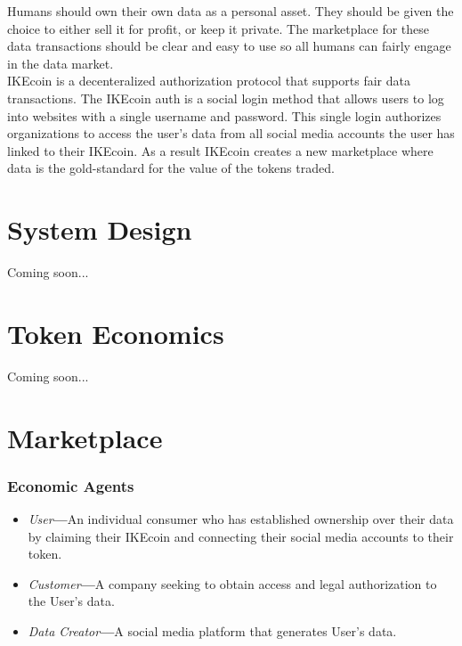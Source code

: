 \documentclass[12pt, letterpaper, twoside]{article}
\begin{document}
Humans should own their own data as a personal asset. They should be given the choice to either sell it for profit, or keep it private. The marketplace for these data transactions should be clear and easy to use so all humans can fairly engage in the data market. \\

IKEcoin is a decenteralized authorization protocol that supports fair data transactions. The IKEcoin auth is a social login method that allows users to log into websites with a single username and password. This single login authorizes organizations to access the user's data from all social media accounts the user has linked to their IKEcoin. As a result IKEcoin creates a new marketplace where data is the gold-standard for the value of the tokens traded. \\

\section{System Design}
Coming soon...


\section{Token Economics}
Coming soon...


\section{Marketplace}
\subsubsection*{Economic Agents}
\begin{itemize}
\item \textit{User}\textbf{---}An individual consumer who has established ownership over their data by claiming their IKEcoin and connecting their social media accounts to their token.
\item \textit{Customer}\textbf{---}A company seeking to obtain access and legal authorization to the User's data.
\item \textit{Data Creator}\textbf{---}A social media platform that generates User's data.
\end{itemize}
\end{document}

